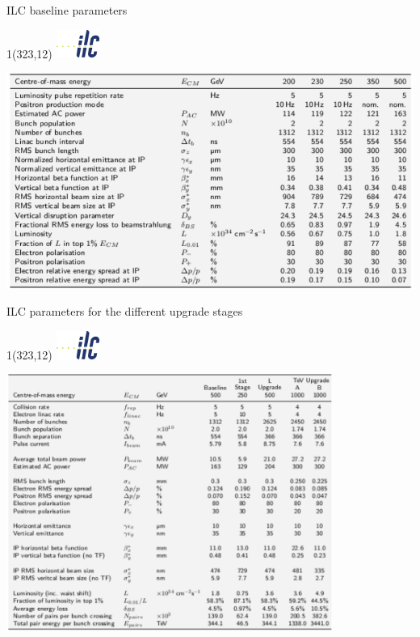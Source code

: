 \documentclass[xcolor={dvipsnames}]{beamer}
\newcommand{\ilclogo}{
  \setlength{\TPHorizModule}{1pt}
  \setlength{\TPVertModule}{1pt}
  \begin{textblock}{1}(323,12)
   \includegraphics[width=40pt,height=26pt]{figures/ILC.jpeg}
  \end{textblock}
}
\begin{document}
\begin{frame}{ILC baseline parameters}
\ilclogo
\centering
	\includegraphics[width=\textwidth]{figures/ILCTDR-VOLUME_3-PART_II_ILCparameters.pdf}
\end{frame}
\begin{frame}{ILC parameters for the different upgrade stages}
\ilclogo
\centering
	\includegraphics[width=0.8\textwidth]{figures/ILCTDR-VOLUME_3-PART_II_ILCparametersUpgrades.pdf}
\end{frame}
\end{document}
